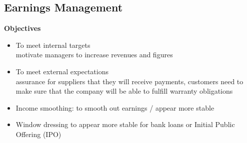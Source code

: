 \documentclass{article}
\begin{document}
\begin{multicols}{2}
\subsection{Earnings Management}
\textbf{Objectives}
\begin{itemize}
	\item To meet internal targets\\
	motivate managers to increase revenues and figures
	\item To meet external expectations\\
	assurance for suppliers that they will receive payments, customers need to make sure that the company will be able to fulfill warranty obligations
	\item Income smoothing: to smooth out earnings / appear more stable
	\item Window dressing to appear more stable for bank loans or Initial Public Offering (IPO)
\end{itemize}


\end{multicols}
\end{document}

